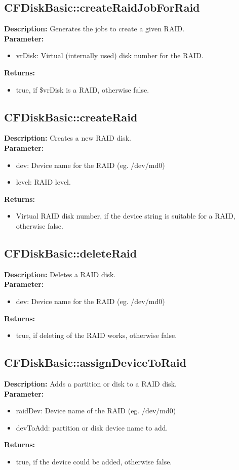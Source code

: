 \subsection{CFDiskBasic::createRaidJobForRaid}
\textbf{Description:} Generates the jobs to create a given RAID.\\
\textbf{Parameter:}
\begin{itemize}
\item vrDisk: Virtual (internally used) disk number for the RAID.
\end{itemize}
\textbf{Returns:}
\begin{itemize}
\item true, if \$vrDisk is a RAID, otherwise false.
\end{itemize}

\subsection{CFDiskBasic::createRaid}
\textbf{Description:} Creates a new RAID disk.\\
\textbf{Parameter:}
\begin{itemize}
\item dev: Device name for the RAID (eg. /dev/md0)
\item level: RAID level.
\end{itemize}
\textbf{Returns:}
\begin{itemize}
\item Virtual RAID disk number, if the device string is suitable for a RAID, otherwise false.
\end{itemize}

\subsection{CFDiskBasic::deleteRaid}
\textbf{Description:} Deletes a RAID disk.\\
\textbf{Parameter:}
\begin{itemize}
\item dev: Device name for the RAID (eg. /dev/md0)
\end{itemize}
\textbf{Returns:}
\begin{itemize}
\item true, if deleting of the RAID works, otherwise false.
\end{itemize}

\subsection{CFDiskBasic::assignDeviceToRaid}
\textbf{Description:} Adds a partition or disk to a RAID disk.\\
\textbf{Parameter:}
\begin{itemize}
\item raidDev: Device name of the RAID (eg. /dev/md0)
\item devToAdd: partition or disk device name to add.
\end{itemize}
\textbf{Returns:}
\begin{itemize}
\item true, if the device could be added, otherwise false.
\end{itemize}

